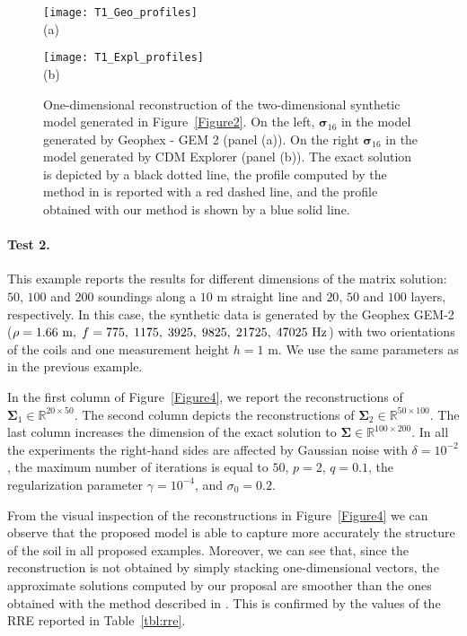 \documentclass[final,leqno]{siamltex}
\newcommand{\R}{{\mathbb R}}
\newcommand{\Sigmab}{\mathbf{\Sigma}}
\begin{document}
\begin{figure}
\centering
\begin{minipage}{0.4\linewidth}
	\centering
	\texttt{[image: T1\_Geo\_profiles]}\\(a)
\end{minipage}
\begin{minipage}{0.4\linewidth}
	\centering
	\texttt{[image: T1\_Expl\_profiles]}\\(b)
\end{minipage}
\caption{One-dimensional reconstruction of the two-dimensional synthetic model generated in Figure~\ref{Figure2}. On the left, $\boldsymbol{\sigma}_{16}$ in the model generated by Geophex - GEM 2 (panel (a)). On the right $\boldsymbol{\sigma}_{16}$ in the model generated by CDM Explorer (panel (b)). The exact solution is depicted by a black dotted line, the profile computed by the method in \cite{ddrv19} is reported with a red dashed line, and the profile obtained with our method is shown by a blue solid line.}
\label{Figure3}
\end{figure}

\paragraph{Test 2.}
This example reports the results for different dimensions of the matrix solution: $50$, $100$ and $200$ soundings along a $10$ m straight line and $20$, $50$ and $100$ layers, respectively.
In this case, the synthetic data is generated by the Geophex GEM-2 ($\rho = 1.66~{\rm m},\; f = 775,\; 1175,\; 3925,\; 9825,\; 21725,\; 47025~{\rm Hz}$) with two orientations of the coils and one measurement height $h = 1$ m. We use the same parameters as in the previous example. 

In the first column of Figure~\ref{Figure4}, we report the reconstructions of $\Sigmab_1\in\R^{20 \times 50}$. The second column depicts the reconstructions of $\Sigmab_2\in\R^{50 \times 100}$. The last column increases the dimension of the exact solution to $\Sigmab\in\R^{100 \times 200}$. In all the experiments the right-hand sides are affected by Gaussian noise with $\delta = 10^{-2}$, the maximum number of iterations is equal to $50$, $p=2$, $q=0.1$, the regularization parameter $\gamma = 10^{-4}$, and $\sigma_0=0.2$.

From the visual inspection of the reconstructions in Figure~\ref{Figure4} we can observe that the proposed model is able to capture more accurately the structure of the soil in all proposed examples. Moreover, we can see that, since the reconstruction is not obtained by simply stacking one-dimensional vectors, the approximate solutions computed by our proposal are smoother than the ones obtained with the method described in \cite{ddrv19}. This is confirmed by the values of the RRE reported in Table~\ref{tbl:rre}.
\end{document}
